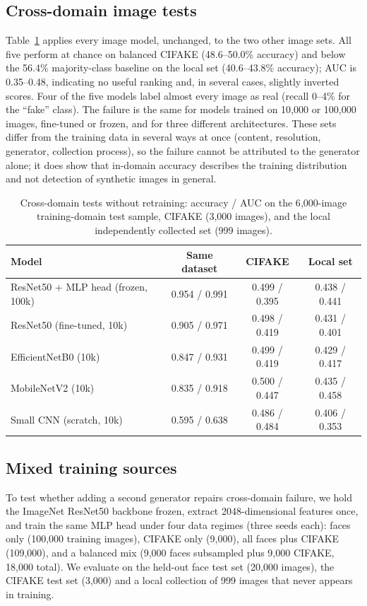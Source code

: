 \documentclass[11pt,a4paper]{article}
\begin{document}
\subsection{Cross-domain image tests}\label{sec:cross}
Table~\ref{tab:cross} applies every image model, unchanged, to the two other image sets. All five perform at chance on balanced CIFAKE (48.6--50.0\% accuracy) and below the 56.4\% majority-class baseline on the local set (40.6--43.8\% accuracy); AUC is 0.35--0.48, indicating no useful ranking and, in several cases, slightly inverted scores. Four of the five models label almost every image as real (recall 0--4\% for the ``fake'' class). The failure is the same for models trained on 10{,}000 or 100{,}000 images, fine-tuned or frozen, and for three different architectures. These sets differ from the training data in several ways at once (content, resolution, generator, collection process), so the failure cannot be attributed to the generator alone; it does show that in-domain accuracy describes the training distribution and not detection of synthetic images in general.

\begin{table}[h]
\centering
\caption{Cross-domain tests without retraining: accuracy / AUC on the 6{,}000-image
training-domain test sample, CIFAKE (3{,}000 images), and the local independently collected set
(999 images).}\label{tab:cross}
\small
\begin{tabular}{lccc}
\toprule
Model & Same dataset & CIFAKE & Local set \\
\midrule
ResNet50 + MLP head (frozen, 100k) & 0.954 / 0.991 & 0.499 / 0.395 & 0.438 / 0.441 \\
ResNet50 (fine-tuned, 10k) & 0.905 / 0.971 & 0.498 / 0.419 & 0.431 / 0.401 \\
EfficientNetB0 (10k) & 0.847 / 0.931 & 0.499 / 0.419 & 0.429 / 0.417 \\
MobileNetV2 (10k) & 0.835 / 0.918 & 0.500 / 0.447 & 0.435 / 0.458 \\
Small CNN (scratch, 10k) & 0.595 / 0.638 & 0.486 / 0.484 & 0.406 / 0.353 \\
\bottomrule
\end{tabular}
\end{table}

\subsection{Mixed training sources}\label{sec:mixed}
To test whether adding a second generator repairs cross-domain failure, we hold the ImageNet ResNet50 backbone frozen, extract 2048-dimensional features once, and train the same MLP head under four data regimes (three seeds each): faces only (100{,}000 training images), CIFAKE only (9{,}000), all faces plus CIFAKE (109{,}000), and a balanced mix (9{,}000 faces subsampled plus 9{,}000 CIFAKE, 18{,}000 total). We evaluate on the held-out face test set (20{,}000 images), the CIFAKE test set (3{,}000) and a local collection of 999 images that never appears in training.
\end{document}
